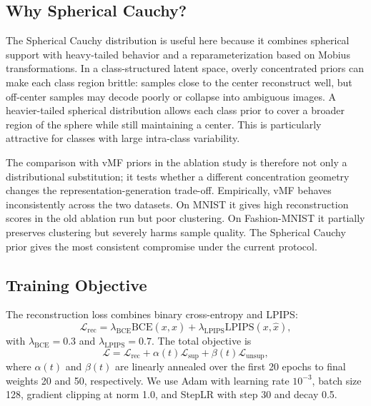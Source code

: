 \documentclass[10pt]{article}
\begin{document}
\subsection{Why Spherical Cauchy?}

The Spherical Cauchy distribution is useful here because it combines spherical support with heavy-tailed behavior and a reparameterization based on Mobius transformations. In a class-structured latent space, overly concentrated priors can make each class region brittle: samples close to the center reconstruct well, but off-center samples may decode poorly or collapse into ambiguous images. A heavier-tailed spherical distribution allows each class prior to cover a broader region of the sphere while still maintaining a center. This is particularly attractive for classes with large intra-class variability.

The comparison with vMF priors in the ablation study is therefore not only a distributional substitution; it tests whether a different concentration geometry changes the representation-generation trade-off. Empirically, vMF behaves inconsistently across the two datasets. On MNIST it gives high reconstruction scores in the old ablation run but poor clustering. On Fashion-MNIST it partially preserves clustering but severely harms sample quality. The Spherical Cauchy prior gives the most consistent compromise under the current protocol.

\subsection{Training Objective}

The reconstruction loss combines binary cross-entropy and LPIPS:
\begin{equation}
    \mathcal{L}_{\mathrm{rec}}
    =
    \lambda_{\mathrm{BCE}}\mathrm{BCE}(x,\hat{x})
    +
    \lambda_{\mathrm{LPIPS}}\mathrm{LPIPS}(x,\hat{x}),
\end{equation}
with $\lambda_{\mathrm{BCE}}=0.3$ and $\lambda_{\mathrm{LPIPS}}=0.7$. The total objective is
\begin{equation}
    \mathcal{L}
    =
    \mathcal{L}_{\mathrm{rec}}
    +
    \alpha(t)\mathcal{L}_{\mathrm{sup}}
    +
    \beta(t)\mathcal{L}_{\mathrm{unsup}},
\end{equation}
where $\alpha(t)$ and $\beta(t)$ are linearly annealed over the first 20 epochs to final weights 20 and 50, respectively. We use Adam with learning rate $10^{-3}$, batch size 128, gradient clipping at norm 1.0, and StepLR with step 30 and decay 0.5.
\end{document}
